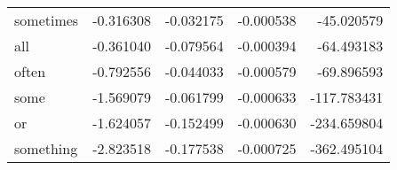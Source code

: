 \begin{table}[ht]
\begin{tabular}{lrrrr}
sometimes & {\cellcolor[HTML]{CCE2EF}} \color[HTML]{000000} -0.316308 & {\cellcolor[HTML]{ACD2E5}} \color[HTML]{000000} -0.032175 & {\cellcolor[HTML]{08366A}} \color[HTML]{F1F1F1} -0.000538 & {\cellcolor[HTML]{A7D0E4}} \color[HTML]{000000} -45.020579 \\
all & {\cellcolor[HTML]{C7E0ED}} \color[HTML]{000000} -0.361040 & {\cellcolor[HTML]{59A1CA}} \color[HTML]{F1F1F1} -0.079564 & {\cellcolor[HTML]{0C3D73}} \color[HTML]{F1F1F1} -0.000394 & {\cellcolor[HTML]{9BC9E0}} \color[HTML]{000000} -64.493183 \\
often & {\cellcolor[HTML]{9DCBE1}} \color[HTML]{000000} -0.792556 & {\cellcolor[HTML]{98C8E0}} \color[HTML]{000000} -0.044033 & {\cellcolor[HTML]{073467}} \color[HTML]{F1F1F1} -0.000579 & {\cellcolor[HTML]{98C8E0}} \color[HTML]{000000} -69.896593 \\
some & {\cellcolor[HTML]{4291C2}} \color[HTML]{F1F1F1} -1.569079 & {\cellcolor[HTML]{7BB6D6}} \color[HTML]{000000} -0.061799 & {\cellcolor[HTML]{063264}} \color[HTML]{F1F1F1} -0.000633 & {\cellcolor[HTML]{71B0D3}} \color[HTML]{F1F1F1} -117.783431 \\
or & {\cellcolor[HTML]{3F8EC0}} \color[HTML]{F1F1F1} -1.624057 & {\cellcolor[HTML]{144E8A}} \color[HTML]{F1F1F1} -0.152499 & {\cellcolor[HTML]{063264}} \color[HTML]{F1F1F1} -0.000630 & {\cellcolor[HTML]{2C75B4}} \color[HTML]{F1F1F1} -234.659804 \\
something & {\cellcolor[HTML]{053061}} \color[HTML]{F1F1F1} -2.823518 & {\cellcolor[HTML]{053061}} \color[HTML]{F1F1F1} -0.177538 & {\cellcolor[HTML]{053061}} \color[HTML]{F1F1F1} -0.000725 & {\cellcolor[HTML]{053061}} \color[HTML]{F1F1F1} -362.495104 \\
\bottomrule
\end{tabular}
\end{table}
